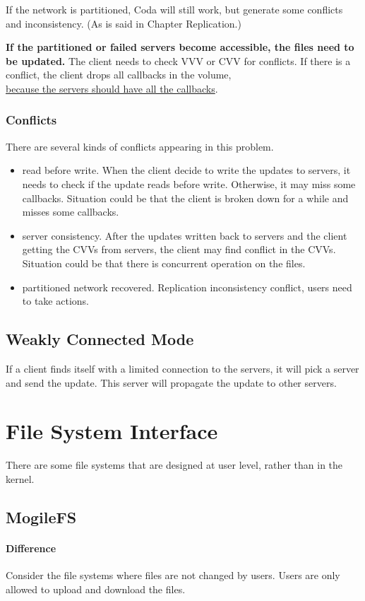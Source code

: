 If the network is partitioned, Coda will still work, but generate some conflicts and inconsistency. (As is said in Chapter Replication.)

\textbf{If the partitioned or failed servers become accessible, the files need to be updated.} The client needs to check VVV or CVV for conflicts. If there is a conflict, the client drops all callbacks in the volume, \\ \underline{because the servers should have all the callbacks}.

\subsubsection{Conflicts}
There are several kinds of conflicts appearing in this problem.
\begin{itemize}
    \item read before write. When the client decide to write the updates to servers, it needs to check if the update reads before write. Otherwise, it may miss some callbacks. Situation could be that the client is broken down for a while and misses some callbacks.
    \item server consistency. After the updates written back to servers and the client getting the CVVs from servers, the client may find conflict in the CVVs. Situation could be that there is concurrent operation on the files.
    \item partitioned network recovered. Replication inconsistency conflict, users need to take actions.
\end{itemize}

\subsection{Weakly Connected Mode}
If a client finds itself with a limited connection to the servers, it will pick a server and send the update. This server will propagate the update to other servers.

\section{File System Interface}
There are some file systems that are designed at user level, rather than in the kernel.
\subsection{MogileFS}
\paragraph{Difference}
Consider the file systems where files are not changed by users. Users are only allowed to upload and download the files. 
